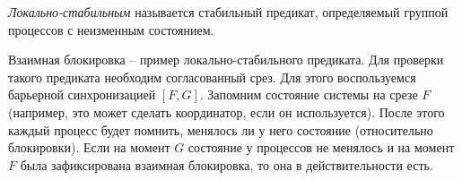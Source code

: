 \begin{definition}
    \textit{Локально-стабильным} называется стабильный предикат, определяемый
    группой процессов с неизменным состоянием.
\end{definition}

\begin{example}
    Взаимная блокировка -- пример локально-стабильного предиката. Для проверки
    такого предиката необходим согласованный срез. Для этого воспользуемся барьерной
    синхронизацией $[F, G]$. Запомним состояние системы на срезе $F$ (например, это
    может сделать координатор, если он используется). После этого каждый
    процесс будет помнить, менялось ли у него состояние (относительно блокировки).
    Если на момент $G$ состояние у процессов не менялось и на момент $F$ была
    зафиксирована взаимная блокировка, то она в действительности есть.
\end{example}

